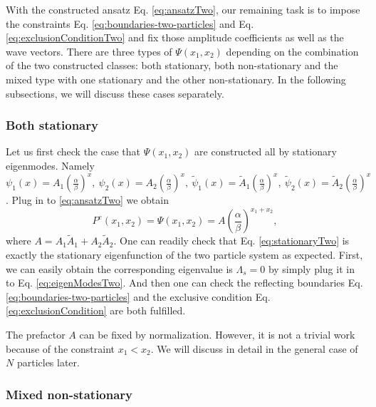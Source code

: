 With the constructed ansatz Eq. \eqref{eq:ansatzTwo}, our remaining task is to impose the constraints Eq. \eqref{eq:boundaries-two-particles} and Eq. \eqref{eq:exclusionConditionTwo} and fix those amplitude coefficients as well as the wave vectors. There are three types of $\Psi(x_1,x_2)$ depending on the combination of the two constructed classes: both stationary, both non-stationary and the mixed type with one stationary and the other non-stationary. In the following subsections, we will discuss these cases separately.  

\subsubsection{Both stationary}
\label{ssub:Both stationary}

Let us first check the case that $\Psi(x_1, x_2)$ are constructed all by stationary eigenmodes. 
Namely $ \psi_1(x) = A_1\left(\frac{\alpha}{\beta}\right)^x, ~\psi_2(x) = A_2\left(\frac{\alpha}{\beta}\right)^x, ~\tilde{\psi}_1(x) = \tilde{A}_1\left(\frac{\alpha}{\beta}\right)^x, ~\tilde{\psi}_2(x) = \tilde{A}_2\left(\frac{\alpha}{\beta}\right)^x$. 
Plug in to \eqref{eq:ansatzTwo} we obtain
\begin{equation}
    \label{eq:stationaryTwo}
    P^e(x_1, x_2) = \Psi(x_1, x_2) = 
    A \left(\frac{\alpha}{\beta}\right)^{x_1+x_2},
\end{equation}
where $A=A_1\tilde{A}_1+A_2\tilde{A}_2$. One can readily check that Eq. \eqref{eq:stationaryTwo} is exactly the stationary eigenfunction of the two particle system as expected. First, we can easily obtain the corresponding eigenvalue is $\Lambda_s=0$ by simply plug it in to Eq. \eqref{eq:eigenModesTwo}.  And then one can check the reflecting boundaries Eq.  \eqref{eq:boundaries-two-particles} and the exclusive condition Eq.  \eqref{eq:exclusionCondition} are both fulfilled. 

The prefactor $A$ can be fixed by normalization. However, it is not a trivial work because of the constraint $x_1 < x_2$. We will discuss in detail in the general case of $N$ particles later. 


\subsubsection{Mixed non-stationary}
\label{ssub:Mixed non-stationary}

